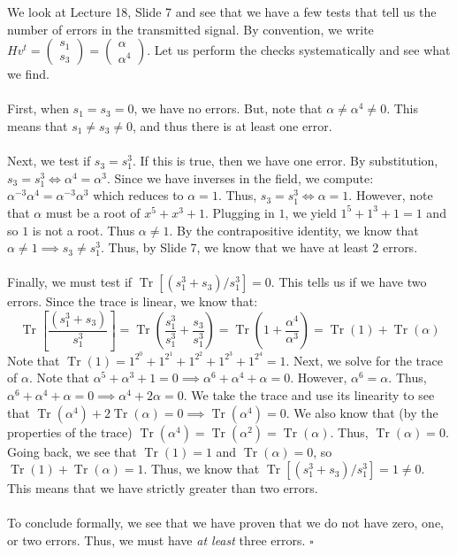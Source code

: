 \documentclass[letterpaper]{article}
\newcommand*{\QED}{\hfill\ensuremath{\square}}%
\DeclareMathOperator{\tr}{Tr}
\begin{document}
We look at Lecture 18, Slide 7 and see that we have a few tests that tell us the number of errors in the transmitted signal.
By convention, we write $ Hv^t = \begin{pmatrix} s_1 \\ s_3 \end{pmatrix} = \begin{pmatrix} \alpha \\ \alpha^4 \end{pmatrix} $.
Let us perform the checks systematically and see what we find.
\\ \\
First, when $ s_1 = s_3 = 0 $, we have no errors.
But, note that $ \alpha \neq \alpha^4 \neq 0 $.
This means that $ s_1 \neq s_3 \neq 0 $, and thus there is at least one error.
\\ \\
Next, we test if $ s_3 = s_1^3 $.
If this is true, then we have one error.
By substitution, $ s_3 = s_1^3 \iff \alpha^4 = \alpha^3 $.
Since we have inverses in the field, we compute: $ \alpha^{-3}\alpha^4 = \alpha^{-3}\alpha^3 $ which reduces to $ \alpha = 1 $.
Thus, $ s_3 = s_1^3 \iff \alpha = 1 $.
However, note that $ \alpha $ must be a root of $ x^5 + x^3 + 1 $.
Plugging in $ 1 $, we yield $ 1^5 + 1^3 + 1 = 1 $ and so $ 1 $ is not a root.
Thus $ \alpha \neq 1 $.
By the contrapositive identity, we know that $ \alpha \neq 1 \implies s_3 \neq s_1^3 $.
Thus, by Slide 7, we know that we have at least $ 2 $ errors.
\\ \\
Finally, we must test if $ \tr{\left[ (s_1^3 + s_3) / s_1^3 \right]} = 0 $.
This tells us if we have two errors.
Since the trace is linear, we know that:
\[
\tr{\left[ \frac{(s_1^3 + s_3)}{s_1^3} \right]} = \tr{\left(\frac{s_1^3}{s_1^3} + \frac{s_3}{s_1^3}\right) = \tr{\left( 1 + \frac{\alpha^4}{\alpha^3} \right)}} = \tr{(1)} + \tr{(\alpha)}
\]
Note that $ \tr{(1)} = 1^{2^0} + 1^{2^1} + 1^{2^2} + 1^{2^3} + 1^{2^4} = 1 $.
Next, we solve for the trace of $ \alpha $.
Note that $ \alpha^5 + \alpha^3 + 1 = 0 \implies \alpha^6 + \alpha^4 + \alpha = 0 $.
However, $ \alpha^6 = \alpha $.
Thus, $ \alpha^6 + \alpha^4 + \alpha = 0 \implies \alpha^4 + 2\alpha = 0 $.
We take the trace and use its linearity to see that $ \tr{(\alpha^4)} + 2\tr{(\alpha)} = 0 \implies \tr{(\alpha^4)} = 0 $.
We also know that (by the properties of the trace) $ \tr{(\alpha^4)} = \tr{(\alpha^2)} = \tr{(\alpha)} $.
Thus, $ \tr{(\alpha)} = 0 $.
Going back, we see that $ \tr{(1)} = 1 $ and $ \tr{(\alpha)} = 0 $, so $ \tr{(1)} + \tr{(\alpha)} = 1 $.
Thus, we know that $ \tr{\left[ (s_1^3 + s_3) / s_1^3 \right]} = 1 \neq 0 $.
This means that we have strictly greater than two errors.
\\ \\
To conclude formally, we see that we have proven that we do not have zero, one, or two errors.
Thus, we must have \textit{at least} three errors.
\QED{}
\end{document}
